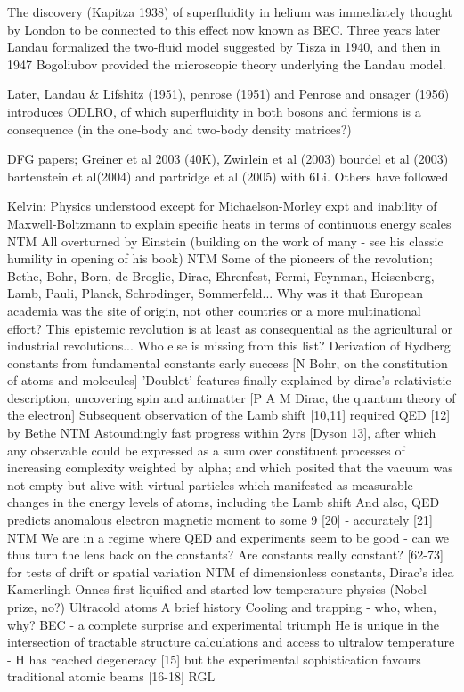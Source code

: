 	The discovery (Kapitza 1938) of superfluidity in helium was immediately thought by London to be connected to this effect now known as BEC.
	Three years later Landau formalized the two-fluid model suggested by Tisza in 1940, and then in 1947 Bogoliubov provided the microscopic theory underlying the Landau model.
	

Later, Landau \& Lifshitz (1951), penrose (1951) and Penrose and onsager (1956) introduces ODLRO, of which superfluidity in both bosons and fermions is a consequence (in the one-body and two-body density matrices?)

DFG papers; Greiner et al 2003 (40K), Zwirlein et al (2003) bourdel et al (2003) bartenstein et al(2004) and partridge et al (2005) with 6Li.
	Others have followed


Kelvin: Physics understood except for Michaelson-Morley expt and inability of Maxwell-Boltzmann to explain specific heats in terms of continuous energy scales NTM
			All overturned by Einstein (building on the work of many - see his classic humility in opening of his book) NTM
			Some of the pioneers of the revolution; Bethe, Bohr, Born, de Broglie, Dirac, Ehrenfest, Fermi, Feynman, Heisenberg, Lamb, Pauli, Planck, Schrodinger, Sommerfeld...
				Why was it that European academia was the site of origin, not other countries or a more multinational effort? This epistemic revolution is at least as consequential as the agricultural or industrial revolutions...
				Who else is missing from this list?
			Derivation of Rydberg constants from fundamental constants early success [N Bohr, on the constitution of atoms and molecules] 
			'Doublet' features finally explained by dirac's relativistic description, uncovering spin and antimatter [P A M Dirac, the quantum theory of the electron]
			Subsequent observation of the Lamb shift [10,11] required QED [12] by Bethe  NTM
			Astoundingly fast progress within 2yrs [Dyson 13], after which any observable could be expressed as a sum over constituent processes of increasing complexity weighted by alpha; and which posited that the vacuum was not empty but alive with virtual particles which manifested as measurable changes in the energy levels of atoms, including the Lamb shift
			And also, QED predicts anomalous electron magnetic moment to some 9 [20] - accurately [21] NTM
			We are in a regime where QED and experiments seem to be good - can we thus turn the lens back on the constants?	
			Are constants really constant? [62-73] for tests of drift or spatial variation  NTM
				cf dimensionless constants, Dirac's idea
Kamerlingh Onnes first liquified and started low-temperature physics (Nobel prize, no?)
Ultracold atoms A brief history Cooling and trapping - who, when, why?
BEC - a complete surprise and experimental triumph
He is unique in the intersection of tractable structure calculations and access to ultralow temperature - H has reached degeneracy [15] but the experimental sophistication favours traditional atomic beams [16-18] RGL


